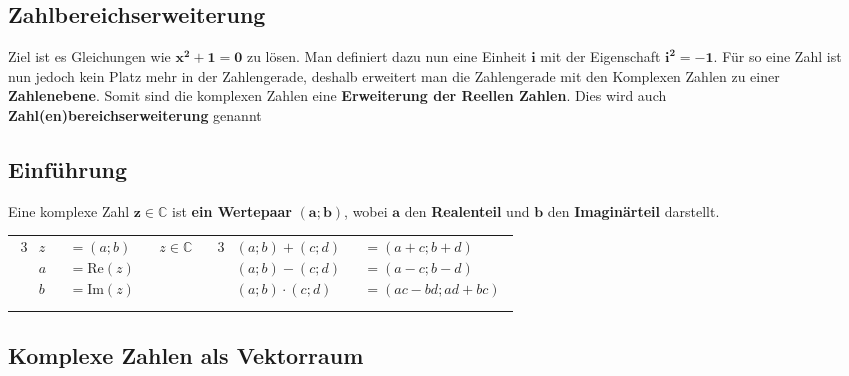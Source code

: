 \subsection{Zahlbereichserweiterung}

\parbox{0.9\textwidth}{
    Ziel ist es Gleichungen wie $\mathbf{x^2 + 1 = 0}$ zu lösen.
    Man definiert dazu nun eine Einheit $\mathbf{i}$ mit der Eigenschaft $\mathbf{i^2 = -1}$.
    Für so eine Zahl ist nun jedoch kein Platz mehr in der Zahlengerade, 
    deshalb erweitert man die Zahlengerade mit den Komplexen Zahlen zu einer \textbf{Zahlenebene}.
    Somit sind die komplexen Zahlen eine \textbf{Erweiterung der Reellen Zahlen}.
    Dies wird auch \textbf{Zahl(en)bereichserweiterung} genannt
} 

\subsection{Einführung}

\parbox{0.9\textwidth}
{
    Eine komplexe Zahl $\mathbf{z \in  \mathbb{C}}$ ist \textbf{ein Wertepaar} $\mathbf{(a; b)}$, wobei $\mathbf{a}$ den \textbf{Realenteil} und $\mathbf{b}$ den \textbf{Imaginärteil} darstellt.

    \begin{tabular}{c|c}
        \parbox{0.45\textwidth}
        {
            \begin{alignat*}{3}
                &z &&= \left(a; b\right) \qquad z \in \mathbb{C} \\ 
                &a &&= \mbox{Re}(z) \\ 
                &b &&= \mbox{Im}(z) \\
            \end{alignat*}
        }
        &
        \parbox{0.45\textwidth}
        {
            \begin{alignat*}{3}
                &\left(a; b\right) + \left(c; d\right) &&= \left(a + c; b + d\right) \\
                &\left(a; b\right) - \left(c; d\right) &&= \left(a - c; b - d\right) \\
                &\left(a; b\right) \cdot \left(c; d\right) &&= \left(ac - bd; ad + bc\right) \\
            \end{alignat*}
        }
    \end{tabular}
}

\subsection{Komplexe Zahlen als Vektorraum}

